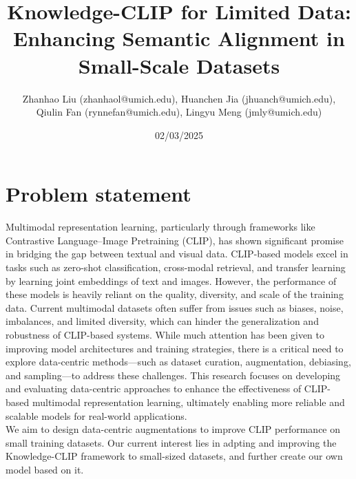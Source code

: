 \documentclass[11pt,letterpaper]{article}
\begin{document}
\title{Knowledge-CLIP for Limited Data: Enhancing Semantic Alignment in Small-Scale Datasets}


\author{
Zhanhao Liu (zhanhaol@umich.edu), 
Huanchen Jia (jhuanch@umich.edu),\\
Qiulin Fan (rynnefan@umich.edu),
Lingyu Meng (jmly@umich.edu)
}

\date{02/03/2025}


\maketitle


\section{Problem statement}
Multimodal representation learning, particularly through frameworks like Contrastive Language–Image Pretraining (CLIP), has shown significant promise in bridging the gap between textual and visual data. CLIP-based models excel in tasks such as zero-shot classification, cross-modal retrieval, and transfer learning by learning joint embeddings of text and images. However, the performance of these models is heavily reliant on the quality, diversity, and scale of the training data. Current multimodal datasets often suffer from issues such as biases, noise, imbalances, and limited diversity, which can hinder the generalization and robustness of CLIP-based systems. While much attention has been given to improving model architectures and training strategies, there is a critical need to explore data-centric methods—such as dataset curation, augmentation, debiasing, and sampling—to address these challenges. This research focuses on developing and evaluating data-centric approaches to enhance the effectiveness of CLIP-based multimodal representation learning, ultimately enabling more reliable and scalable models for real-world applications.\\
We aim to design data-centric augmentations to improve CLIP performance on small training datasets. Our current interest lies in adpting and improving the Knowledge-CLIP framework\cite{pan2022contrastivelanguageimagepretrainingknowledge} to small-sized datasets, and further create our own model based on it.
\end{document}
